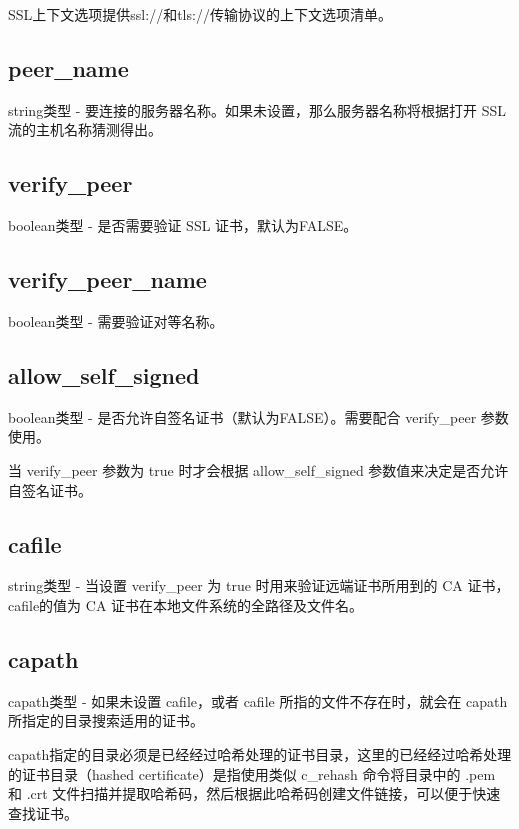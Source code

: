 SSL上下文选项提供ssl://和tls://传输协议的上下文选项清单。

\subsection{peer\_name}

string类型 - 要连接的服务器名称。如果未设置，那么服务器名称将根据打开 SSL 流的主机名称猜测得出。


\subsection{verify\_peer}

boolean类型 - 是否需要验证 SSL 证书，默认为FALSE。


\subsection{verify\_peer\_name}

boolean类型 - 需要验证对等名称。

\subsection{allow\_self\_signed}

boolean类型 - 是否允许自签名证书（默认为FALSE）。需要配合 verify\_peer 参数使用。

当 verify\_peer 参数为 true 时才会根据 allow\_self\_signed 参数值来决定是否允许自签名证书。

\subsection{cafile}

string类型 - 当设置 verify\_peer 为 true 时用来验证远端证书所用到的 CA 证书，cafile的值为 CA 证书在本地文件系统的全路径及文件名。

\subsection{capath}

capath类型 - 如果未设置 cafile，或者 cafile 所指的文件不存在时，就会在 capath 所指定的目录搜索适用的证书。 

capath指定的目录必须是已经经过哈希处理的证书目录，这里的已经经过哈希处理的证书目录（hashed certificate）是指使用类似 c\_rehash 命令将目录中的 .pem 和 .crt 文件扫描并提取哈希码，然后根据此哈希码创建文件链接，可以便于快速查找证书。




